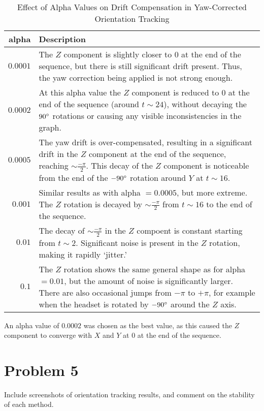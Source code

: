 \documentclass[12pt,a4paper]{article}
\begin{document}
	\begin{table}[h!]
		\caption{Effect of Alpha Values on Drift Compensation in Yaw-Corrected Orientation Tracking}
		\label{table_alpha_yaw}
		\begin{tabu} to 1.0\linewidth {|r|X[l]|}
			\hline
			alpha&Description\\
			\hline
			$0.0001$&The $Z$ component is slightly closer to $0$ at the end of the sequence, but there is still significant drift present. Thus, the yaw correction being applied is not strong enough.\\
			\hline
			$0.0002$&At this alpha value the $Z$ component is reduced to 0 at the end of the sequence (around $t\sim24$), without decaying the $90\degree$ rotations or causing any visible inconsistencies in the graph.\\
			\hline
			$0.0005$&The yaw drift is over-compensated, resulting in a significant drift in the $Z$ component at the end of the sequence, reaching $\sim\frac{-\pi}{2}$. This decay of the $Z$ component is noticeable from the end of the $-90\degree$ rotation around $Y$ at $t\sim16$.\\
			\hline
			$0.001$&Similar results as with alpha $=0.0005$, but more extreme. The $Z$ rotation is decayed by $\sim\frac{-\pi}{2}$ from $t\sim16$ to the end of the sequence.\\
			\hline
			$0.01$&The decay of $\sim\frac{-\pi}{2}$ in the $Z$ compoent is constant starting from $t\sim2$. Significant noise is present in the $Z$ rotation, making it rapidly `jitter.'\\
			\hline
			$0.1$&The $Z$ rotation shows the same general shape as for alpha $=0.01$, but the amount of noise is significantly larger. There are also occasional jumps from $-\pi$ to $+\pi$, for example when the headset is rotated by $-90\degree$ around the $Z$ axis.\\
			\hline
		\end{tabu}
	\end{table}
	
	\noindent An alpha value of $0.0002$ was chosen as the best value, as this caused the $Z$ component to converge with $X$ and $Y$ at $0$ at the end of the sequence.
	
	\section*{Problem 5}
	
	Include screenshots of orientation tracking results, and comment on the stability of each method.
	
\end{document}
